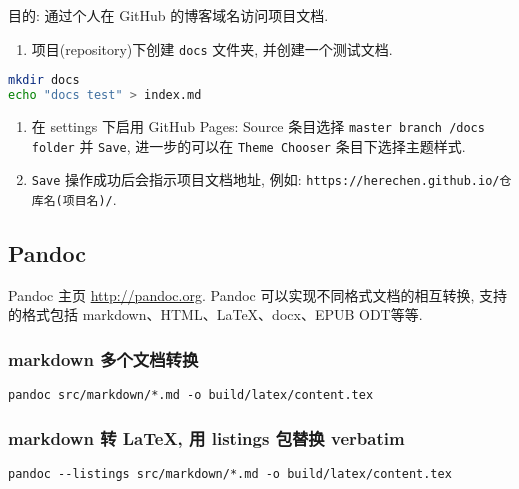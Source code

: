 目的: 通过个人在 GitHub 的博客域名访问项目文档.

\begin{enumerate}
\def\labelenumi{\arabic{enumi}.}
\tightlist
\item
  项目(repository)下创建 \lstinline!docs! 文件夹, 并创建一个测试文档.
\end{enumerate}

\begin{lstlisting}[language=bash]
mkdir docs
echo "docs test" > index.md
\end{lstlisting}

\begin{enumerate}
\def\labelenumi{\arabic{enumi}.}
\setcounter{enumi}{1}
\tightlist
\item
  在 settings 下启用 GitHub Pages: Source 条目选择
  \lstinline!master branch /docs folder! 并 \lstinline!Save!,
  进一步的可以在 \lstinline!Theme Chooser! 条目下选择主题样式.
\item
  \lstinline!Save! 操作成功后会指示项目文档地址, 例如:
  \lstinline!https://herechen.github.io/仓库名(项目名)/!.
\end{enumerate}

\subsection{Pandoc}\label{pandoc}

Pandoc 主页 \url{http://pandoc.org}. Pandoc
可以实现不同格式文档的相互转换, 支持的格式包括
markdown、HTML、LaTeX、docx、EPUB ODT等等.

\subsubsection{markdown
多个文档转换}\label{markdown-ux591aux4e2aux6587ux6863ux8f6cux6362}

\begin{lstlisting}
pandoc src/markdown/*.md -o build/latex/content.tex
\end{lstlisting}

\subsubsection{markdown 转 LaTeX, 用 listings 包替换
verbatim}\label{markdown-ux8f6c-latex-ux7528-listings-ux5305ux66ffux6362-verbatim}

\begin{lstlisting}
pandoc --listings src/markdown/*.md -o build/latex/content.tex
\end{lstlisting}

